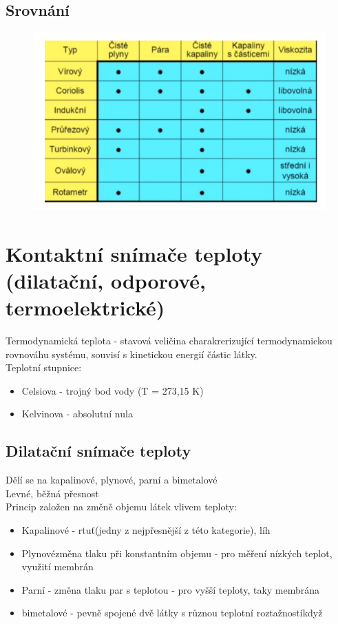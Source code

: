 \subsection*{Srovnání}

\begin{figure}[h]
    \centering
    \includegraphics[scale = 1]{img/srovnaniprutok.png}
\end{figure}

\section{Kontaktní snímače teploty (dilatační, odporové, termoelektrické)}
Termodynamická teplota - stavová veličina charakrerizující termodynamickou rovnováhu systému, souvisí s kinetickou energií částic látky.\\
Teplotní stupnice:
\begin{itemize}
    \item Celsiova  - trojný bod vody (T = 273,15 K)
    \item Kelvinova - absolutní nula 
\end{itemize}
\subsection*{Dilatační snímače teploty}

Dělí se na kapalinové, plynové, parní a bimetalové\\
Levné, běžná přesnost\\
Princip založen na změně objemu látek vlivem teploty:
\begin{itemize}
    \item Kapalinové - rtuť(jedny z nejpřesnější z této kategorie), líh 
    \item Plynovézměna tlaku při konstantním objemu - pro měření nízkých teplot, využití membrán 
    \item Parní - změna tlaku par s teplotou - pro vyšší teploty, taky membrána 
    \item bimetalové - pevně spojené dvě látky s různou teplotní roztažnostíkdyž 
\end{itemize}

